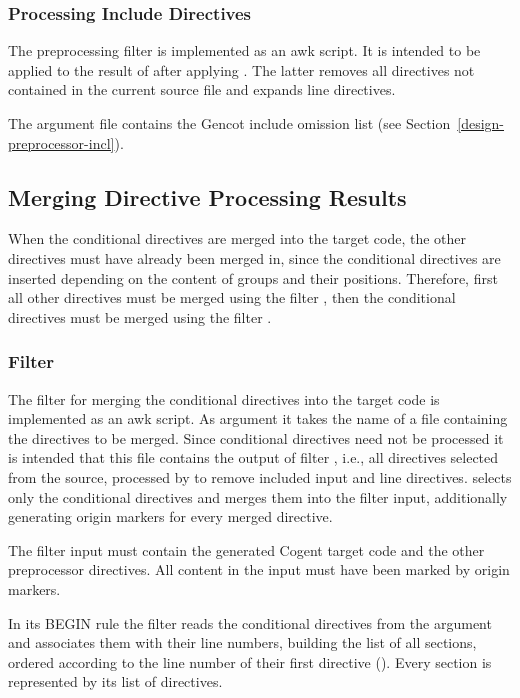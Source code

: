\subsubsection{Processing Include Directives}

The preprocessing filter  is implemented as an awk script. It is intended to be applied to the result
of  after applying . The latter removes all directives not contained
in the current source file and expands line directives. 

The argument file contains the Gencot include omission list (see Section~\ref{design-preprocessor-incl}).

\subsection{Merging Directive Processing Results}
\label{impl-preprocessor-merge}

When the conditional directives are merged into the target code, the other 
directives must have already been merged in, since the conditional directives are inserted depending on the content 
of groups and their positions. Therefore, first all other directives must be merged using the filter ,
then the conditional directives must be merged using the filter .

\subsubsection{Filter }

The filter for merging the conditional directives into the target code is implemented as an awk script. As argument
it takes the name of a file containing the directives to be merged. Since conditional directives need not be
processed it is intended that this file contains the output of filter , i.e., all directives
selected from the source, processed by  to remove included input and line directives. 
 selects only the conditional directives and merges them into
the filter input, additionally generating origin markers for every merged directive. 

The filter input must contain the generated Cogent target code and the other preprocessor directives. 
All content in the input must have been marked by origin markers. 

In its BEGIN rule the filter reads the
conditional directives from the argument  and associates them with their line numbers, building the
list of all sections, ordered according to the line number of their first directive ().
Every section is represented by its list of directives.


